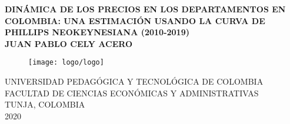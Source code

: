 \begin{center}
\thispagestyle{empty}  \textbf{
DINÁMICA DE LOS PRECIOS EN LOS DEPARTAMENTOS EN COLOMBIA: UNA ESTIMACIÓN USANDO LA CURVA DE PHILLIPS NEOKEYNESIANA (2010-2019)}\\[6.0cm]
\textbf{JUAN PABLO CELY ACERO}\\[2.0cm]

\begin{figure}[H]
  	\centering 	
	\texttt{[image: logo/logo]}
	\end{figure}
\vspace*{2.0cm}
UNIVERSIDAD PEDAGÓGICA Y TECNOLÓGICA DE COLOMBIA\\
FACULTAD DE CIENCIAS ECONÓMICAS Y ADMINISTRATIVAS\\
TUNJA, COLOMBIA\\
2020\\
\end{center}

\newpage{\pagestyle{empty}\cleardoublepage}

